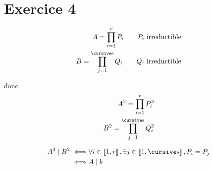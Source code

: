 \part{Exercice 4}

\begin{align*}
	A = \prod_{i=1}^{r} P_i \qquad P_i \text{ irreductible}\\
	B = \prod_{j=1}^{\s} Q_i \qquad Q_i \text{ irreductible}
\end{align*}

donc 
\begin{align*}
	A^2 = \prod_{i=1}^r P_i^2\\
	B^2 = \prod_{j=1}^\s Q_i^2
\end{align*}

\begin{align*}
	A^2 \mid B^2 \iff& \forall i \in \left\llbracket 1,r \right\rrbracket, \exists j \in \left\llbracket 1, \s \right\rrbracket, P_i = P_j\\
	\iff& A  \mid b
\end{align*}
